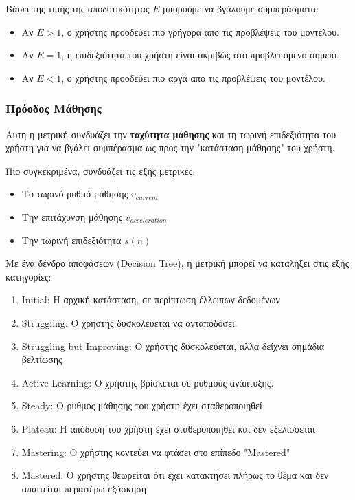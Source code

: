 Βάσει της τιμής της αποδοτικότητας $E$ μπορούμε να βγάλουμε συμπεράσματα:
\begin{itemize}
    \item Αν $E > 1$, ο χρήστης προοδεύει πιο γρήγορα απο τις προβλέψεις του μοντέλου.
    \item Αν $E = 1$, η επιδεξιότητα του χρήστη είναι ακριβώς στο προβλεπόμενο σημείο.
    \item Αν $E < 1$, ο χρήστης προοδεύει πιο αργά απο τις προβλέψεις του μοντέλου.
\end{itemize}

\subsubsection{Πρόοδος Μάθησης}
Αυτη η μετρική συνδυάζει την \textbf{ταχύτητα μάθησης} και τη τωρινή επιδεξιότητα του χρήστη για να βγάλει συμπέρασμα ως προς την "κατάσταση μάθησης" του χρήστη.

Πιο συγκεκριμένα, συνδυάζει τις εξής μετρικές:
\begin{itemize}
    \item Το τωρινό ρυθμό μάθησης \textbf{$v_{current}$}
    \item Την επιτάχυνση μάθησης \textbf{$v_{acceleration}$}
    \item Την τωρινή επιδεξιότητα \textbf{$s(n)$}
\end{itemize}

Με ένα δένδρο αποφάσεων (\textlatin{Decision Tree}), η μετρική μπορεί να καταλήξει στις εξής κατηγορίες:
\begin{enumerate}
    \item \textlatin{Initial}: Η αρχική κατάσταση, σε περίπτωση έλλειπων δεδομένων
    \item \textlatin{Struggling}: Ο χρήστης δυσκολεύεται να ανταποδόσει.
    \item \textlatin{Struggling but Improving}: Ο χρήστης δυσκολεύεται, αλλα δείχνει σημάδια βελτίωσης
    \item \textlatin{Active Learning}: Ο χρήστης βρίσκεται σε ρυθμούς ανάπτυξης.
    \item \textlatin{Steady}: Ο ρυθμός μάθησης του χρήστη έχει σταθεροποιηθεί
    \item \textlatin{Plateau}: Η απόδοση του χρήστη έχει σταθεροποιηθεί και δεν εξελίσσεται
    \item \textlatin{Mastering}: Ο χρήστης κοντεύει να φτάσει στο επίπεδο "\textlatin{Mastered}"
    \item \textlatin{Mastered}: Ο χρήστης θεωρείται ότι έχει κατακτήσει πλήρως το θέμα και δεν απαιτείται περαιτέρω εξάσκηση
\end{enumerate}

